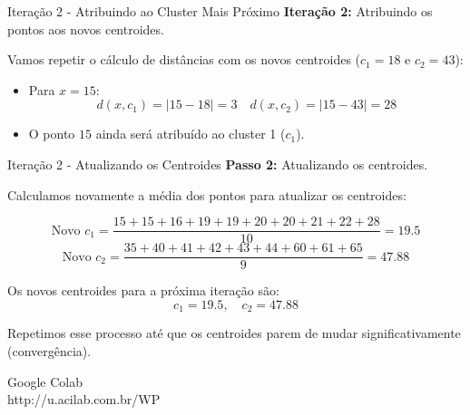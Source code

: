 \documentclass{beamer}
\begin{document}
\begin{frame}{Iteração 2 - Atribuindo ao Cluster Mais Próximo}
    \textbf{Iteração 2:} Atribuindo os pontos aos novos centroides.

    Vamos repetir o cálculo de distâncias com os novos centroides (\(c_1 = 18\) e \(c_2 = 43\)):

    \begin{itemize}
        \item Para \(x = 15\):
        \[
        d(x, c_1) = |15 - 18| = 3 \quad d(x, c_2) = |15 - 43| = 28
        \]
        \item O ponto \(15\) ainda será atribuído ao cluster 1 (\(c_1\)).
    \end{itemize}

\end{frame}


\begin{frame}{Iteração 2 - Atualizando os Centroides}
    \textbf{Passo 2:} Atualizando os centroides.

    Calculamos novamente a média dos pontos para atualizar os centroides:

    \[
    \text{Novo } c_1 = \frac{15 + 15 + 16 + 19 + 19 + 20 + 20 + 21 + 22 + 28}{10} = 19.5
    \]
    \[
    \text{Novo } c_2 = \frac{35 + 40 + 41 + 42 + 43 + 44 + 60 + 61 + 65}{9} = 47.88
    \]

    Os novos centroides para a próxima iteração são:
    \[
    c_1 = 19.5, \quad c_2 = 47.88
    \]

    Repetimos esse processo até que os centroides parem de mudar significativamente (convergência).
\end{frame}





\begin{frame}
    \centering
    \huge
    Google Colab\\


    \small
    http://u.acilab.com.br/WP
        
\end{frame}
\end{document}
